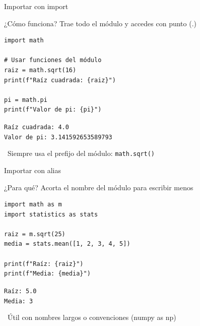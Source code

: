 \documentclass{beamer}
\begin{document}
\begin{frame}[fragile]{Importar con import \faFileImport}
\begin{conceptbox}{¿Cómo funciona?}
Trae todo el módulo y accedes con punto (.)
\end{conceptbox}

\begin{lstlisting}
import math

# Usar funciones del módulo
raiz = math.sqrt(16)
print(f"Raíz cuadrada: {raiz}")

pi = math.pi
print(f"Valor de pi: {pi}")
\end{lstlisting}

\vspace{-0.2cm}
\begin{tcolorbox}[colback=green!10,colframe=green,title={\small\faArrowCircleRight \ Salida},coltitle=fg0,left=3pt,right=3pt,top=2pt,bottom=2pt,boxsep=1pt]
\small\texttt{Raíz cuadrada: 4.0\\
Valor de pi: 3.141592653589793}
\end{tcolorbox}

\vspace{-0.1cm}
\begin{notebox}
\small\faInfoCircle\ Siempre usa el prefijo del módulo: \texttt{math.sqrt()}
\end{notebox}
\end{frame}

\begin{frame}[fragile]{Importar con alias \faTag}
\begin{conceptbox}{¿Para qué?}
Acorta el nombre del módulo para escribir menos
\end{conceptbox}

\begin{lstlisting}
import math as m
import statistics as stats

raiz = m.sqrt(25)
media = stats.mean([1, 2, 3, 4, 5])

print(f"Raíz: {raiz}")
print(f"Media: {media}")
\end{lstlisting}

\vspace{-0.2cm}
\begin{tcolorbox}[colback=green!10,colframe=green,title={\small\faArrowCircleRight \ Salida},coltitle=fg0,left=3pt,right=3pt,top=2pt,bottom=2pt,boxsep=1pt]
\small\texttt{Raíz: 5.0\\
Media: 3}
\end{tcolorbox}

\vspace{-0.1cm}
\begin{notebox}
\small\faLightbulb\ Útil con nombres largos o convenciones (numpy as np)
\end{notebox}
\end{frame}
\end{document}
